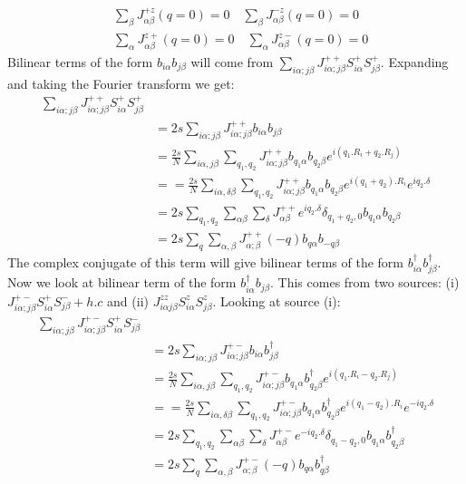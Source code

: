 \begin{equation}
\begin{split}
&\sum_{\beta}^{}J^{+z}_{\alpha \beta}(q = 0) = 0 \quad \sum_{\beta}^{}J^{-z}_{\alpha \beta}(q = 0) = 0\\
&\sum_{\alpha}^{}J^{z+}_{\alpha \beta}(q = 0) = 0 \quad \sum_{\alpha}^{}J^{z-}_{\alpha \beta}(q = 0) = 0
\end{split}
\end{equation}
Bilinear terms of the form $ b_{i\alpha}b_{j\beta} $ will come from $ \sum_{i\alpha;j\beta}^{}J^{++}_{i\alpha;j\beta}S^+_{i\alpha}S^+_{j\beta} $. Expanding and taking the Fourier transform we get:
\begin{equation}
\begin{split}
\sum_{i\alpha;j\beta}^{}J^{++}_{i\alpha;j\beta}S^+_{i\alpha}S^+_{j\beta}&\\
&=2s\sum_{i\alpha;j\beta}^{}J^{++}_{i\alpha;j\beta}b_{i\alpha}b_{j\beta}\\
&=\frac{2s}{N}\sum_{i\alpha,j\beta}^{}\sum_{q_1,q_2}^{}J^{++}_{i\alpha;j\beta}b_{q_1\alpha}b_{q_2\beta}e^{i(q_1.R_i + q_2.R_j)}\\
& = =\frac{2s}{N}\sum_{i\alpha,\delta \beta}^{}\sum_{q_1,q_2}^{}J^{++}_{i\alpha;j\beta}b_{q_1\alpha}b_{q_2\beta}e^{i(q_1 + q_2).R_i}e^{iq_2.\delta}\\
& = 2s\sum_{q_1,q_2}^{}\sum_{\alpha \beta}^{}\sum_{\delta}^{}J^{++}_{\alpha \beta}e^{iq_2.\delta}\delta_{q_1+q_2,0}b_{q_1\alpha}b_{q_2\beta}\\
& = 2s\sum_{q}^{}\sum_{\alpha,\beta}^{}J^{++}_{\alpha;\beta}(-q)b_{q\alpha}b_{-q\beta}
\end{split}
\end{equation}
The complex conjugate of this term will give bilinear terms of the form $ b_{i\alpha}^\dagger b_{j\beta}^\dagger $.\\Now we look at bilinear term of the form $ b_{i\alpha}^\dagger b_{j\beta} $. This comes from two sources: (i) $ J^{+-}_{i\alpha;j\beta}S^+_{i\alpha}S^-_{j\beta} + h.c $ and (ii) $J^{zz}_{i\alpha j\beta}S^z_{i\alpha}S^z_{j\beta}$. Looking at source (i):
\begin{equation}
\begin{split}
\sum_{i\alpha;j\beta}^{}J^{+-}_{i\alpha;j\beta}S^+_{i\alpha}S^-_{j\beta}&\\
&=2s\sum_{i\alpha;j\beta}^{}J^{+-}_{i\alpha;j\beta}b_{i\alpha}b^\dagger_{j\beta}\\
&=\frac{2s}{N}\sum_{i\alpha,j\beta}^{}\sum_{q_1,q_2}^{}J^{+-}_{i\alpha;j\beta}b_{q_1\alpha}b^\dagger_{q_2\beta}e^{i(q_1.R_i - q_2.R_j)}\\
& = =\frac{2s}{N}\sum_{i\alpha,\delta \beta}^{}\sum_{q_1,q_2}^{}J^{+-}_{i\alpha;j\beta}b_{q_1\alpha}b^\dagger_{q_2\beta}e^{i(q_1 - q_2).R_i}e^{-iq_2.\delta}\\
& = 2s\sum_{q_1,q_2}^{}\sum_{\alpha \beta}^{}\sum_{\delta}^{}J^{+-}_{\alpha \beta}e^{-iq_2.\delta}\delta_{q_1-q_2,0}b_{q_1\alpha}b^\dagger_{q_2\beta}\\
&=2s\sum_{q}^{}\sum_{\alpha,\beta}^{}J^{+-}_{\alpha;\beta}(-q)b_{q\alpha}b^\dagger_{q\beta}
\end{split}
\end{equation}
